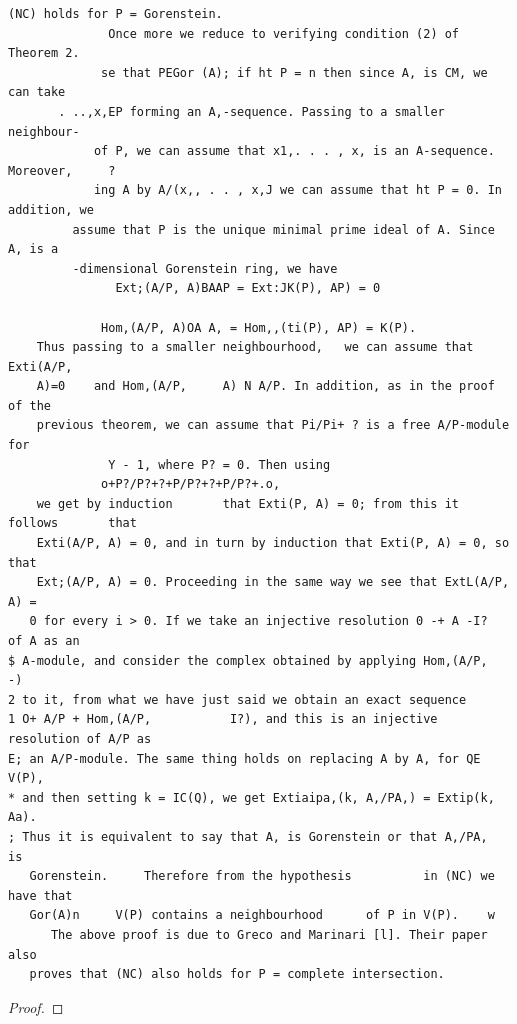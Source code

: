 \begin{theorem}\label{mcrt-auto-theorem-24-6}\uses{}
\begin{verbatim}
(NC) holds for P = Gorenstein.
              Once more we reduce to verifying condition (2) of Theorem 2.
             se that PEGor (A); if ht P = n then since A, is CM, we can take
       . ..,x,EP forming an A,-sequence. Passing to a smaller neighbour-
            of P, we can assume that x1,. . . , x, is an A-sequence. Moreover,     ?
            ing A by A/(x,, . . , x,J we can assume that ht P = 0. In addition, we
         assume that P is the unique minimal prime ideal of A. Since A, is a
         -dimensional Gorenstein ring, we have
               Ext;(A/P, A)BAAP = Ext:JK(P), AP) = 0

             Hom,(A/P, A)OA A, = Hom,,(ti(P), AP) = K(P).
    Thus passing to a smaller neighbourhood,   we can assume that Exti(A/P,
    A)=0    and Hom,(A/P,     A) N A/P. In addition, as in the proof of the
    previous theorem, we can assume that Pi/Pi+ ? is a free A/P-module for
              Y - 1, where P? = 0. Then using
             o+P?/P?+?+P/P?+?+P/P?+.o,
    we get by induction       that Exti(P, A) = 0; from this it follows       that
    Exti(A/P, A) = 0, and in turn by induction that Exti(P, A) = 0, so that
    Ext;(A/P, A) = 0. Proceeding in the same way we see that ExtL(A/P, A) =
   0 for every i > 0. If we take an injective resolution 0 -+ A -I?     of A as an
$ A-module, and consider the complex obtained by applying Hom,(A/P,             -)
2 to it, from what we have just said we obtain an exact sequence
1 O+ A/P + Hom,(A/P,           I?), and this is an injective resolution of A/P as
E; an A/P-module. The same thing holds on replacing A by A, for QE V(P),
* and then setting k = IC(Q), we get Extiaipa,(k, A,/PA,) = Extip(k, Aa).
; Thus it is equivalent to say that A, is Gorenstein or that A,/PA,                is
   Gorenstein.     Therefore from the hypothesis          in (NC) we have that
   Gor(A)n     V(P) contains a neighbourhood      of P in V(P).    w
      The above proof is due to Greco and Marinari [l]. Their paper also
   proves that (NC) also holds for P = complete intersection.
\end{verbatim}
\end{theorem}
\begin{proof}
\notready
\end{proof}


